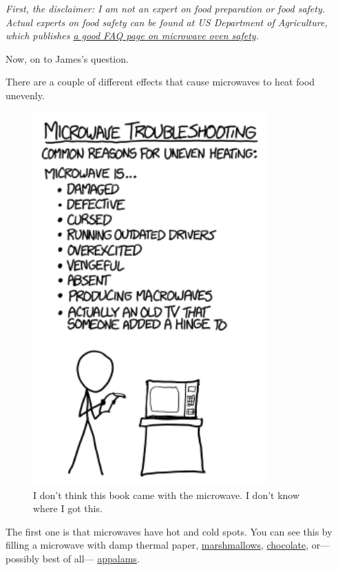 {{ \emph{First, the disclaimer: I am not an expert on food preparation or food safety. Actual experts on food safety can be found at US Department of Agriculture, which publishes \href{http://www.fsis.usda.gov/wps/portal/fsis/topics/food-safety-education/get-answers/food-safety-fact-sheets/appliances-and-thermometers/microwave-ovens-and-food-safety}{a good FAQ page on microwave oven safety}.} }

{Now, on to James's question.}

{There are a couple of different effects that cause microwaves to heat food unevenly.}

\begin{figure}[!htbp]
\centering
\includegraphics[scale=0.5, max width=0.8\textwidth]{imgs/a/131/microwave.png}
\caption{I don't think this book came with the microwave. I don't know where I got this.}
\end{figure}

{The first one is that microwaves have hot and cold spots. You can see this by filling a microwave with damp thermal paper, \href{https://physicamechanica.wordpress.com/2013/12/04/speed-of-light-in-a-microwave/}{marshmallows}, \href{https://www.youtube.com/watch?v=cZ3X3ppLKrM}{chocolate}, or—possibly best of all— \href{http://www.evilmadscientist.com/2011/microwave-oven-diagnostics-with-indian-snack-food/} {appalams}.}

}
